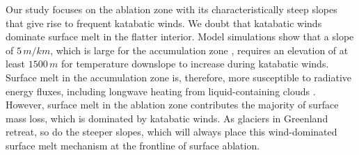 \documentclass[draft]{agujournal2019}
\begin{document}
Our study focuses on the ablation zone 
with its characteristically steep slopes that 
give rise to frequent katabatic winds. 
We doubt that katabatic winds 
dominate surface melt in the flatter interior. 
Model simulations \cite{Vihma2011} 
show that a slope of $5 \, m/km$, 
which is large for the accumulation zone \cite{Helm2014}, 
requires an elevation of at least $1500\,m$ 
for temperature downslope to increase during katabatic winds. 
Surface melt in the accumulation zone is, therefore, 
more susceptible to radiative energy fluxes, 
including longwave heating from liquid-containing clouds
\cite{Shupe2013, Miller2015}. 
However, surface melt in the ablation zone 
contributes the majority of surface mass loss, 
which is dominated by katabatic winds. 
As glaciers in Greenland retreat, so do the steeper slopes, 
which will always place this wind-dominated surface melt mechanism 
at the frontline of surface ablation.





%
%
%
%
%
%
%
%
%
%
\end{document}
